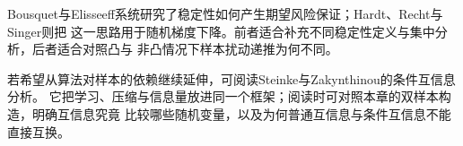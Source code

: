 Bousquet与Elisseeff系统研究了稳定性如何产生期望风险保证；Hardt、Recht与Singer则把
这一思路用于随机梯度下降。前者适合补充不同稳定性定义与集中分析，后者适合对照凸与
非凸情况下样本扰动递推为何不同。

若希望从算法对样本的依赖继续延伸，可阅读Steinke与Zakynthinou的条件互信息分析。
它把学习、压缩与信息量放进同一个框架；阅读时可对照本章的双样本构造，明确互信息究竟
比较哪些随机变量，以及为何普通互信息与条件互信息不能直接互换。
